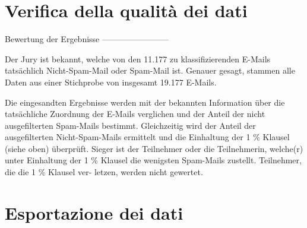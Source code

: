 \section{Verifica della qualità dei dati}

Bewertung der Ergebnisse
------------------------

Der Jury ist bekannt, welche von den 11.177 zu klassifizierenden
E-Mails tatsächlich Nicht-Spam-Mail oder Spam-Mail ist. Genauer
gesagt, stammen alle Daten aus einer Stichprobe von insgesamt
19.177 E-Mails.

Die eingesandten Ergebnisse werden mit der bekannten Information über
die tatsächliche Zuordnung der E-Mails verglichen und der Anteil der
nicht ausgefilterten Spam-Mails bestimmt. Gleichzeitig wird der Anteil
der ausgefilterten Nicht-Spam-Mails ermittelt und die Einhaltung
der 1 \% Klausel (siehe oben) überprüft. Sieger ist der Teilnehmer
oder die Teilnehmerin, welche(r) unter Einhaltung der 1 \% Klausel die
wenigsten Spam-Mails zustellt. Teilnehmer, die die 1 \% Klausel ver-
letzen, werden nicht gewertet.

\section{Esportazione dei dati}

